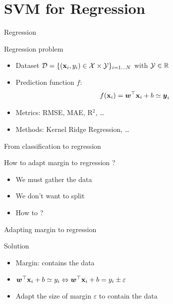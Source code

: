 \documentclass[11pt, pdf, compress, handout]{beamer}
\begin{document}
\section{SVM for Regression}
\begin{frame}[plain]
  
\end{frame}

\begin{frame}{Regression}
  \begin{block}{Regression problem}
    \begin{itemize}
    \item Dataset ${\mathcal{D}} = \{({\mathbf{x}}_i,y_i) \in {\mathcal{X}} \times {\mathcal{Y}}\}_{i=1 \dots
        N}$ with ${\mathcal{Y}} \in {\mathbb{R}}$
    \item Prediction function $f$:
      $$f({\mathbf{x}}_i) = {\boldsymbol{w}}^\top {\mathbf{x}}_i + b \simeq {\boldsymbol{y}}_i$$
    \item Metrics: RMSE, MAE, R$^2$, \dots
    \item Methods: Kernel Ridge Regression, \dots
    \end{itemize}
  \end{block}
\end{frame}
\begin{frame}{From classification to regression}
  \begin{block}{How to adapt margin to regression ?}
    \begin{itemize}
    \item We must gather the data 
    \item We don't want to split
    \item How to  ?
    \end{itemize}
  \end{block}
\end{frame}
\begin{frame}{Adapting margin to regression}
  \begin{block}{Solution}
    \begin{itemize}
    \item Margin: contains the data
    \item ${\boldsymbol{w}}^\top{\mathbf{x}}_i +b \simeq y_i \Leftrightarrow  {\boldsymbol{w}}^\top{\mathbf{x}}_i +b
      = y_i \pm \varepsilon $
    \item Adapt the size of margin $\varepsilon$ to contain the data
    \end{itemize}
    
  \end{block}
  \begin{center}
  \end{center}

\end{frame}
\end{document}
